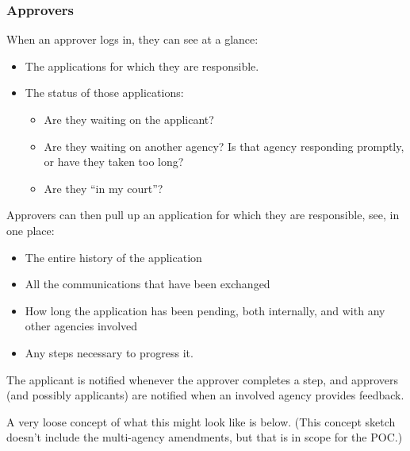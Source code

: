 \documentclass[12pt,a4paper,twosided]{article}
\begin{document}
\subsubsection{Approvers}

When an approver logs in, they can see at a glance:

\begin{itemize}
\itemsep1pt\parskip0pt
\item
  The applications for which they are responsible.
\item
  The status of those applications:

  \begin{itemize}
  \itemsep1pt\parskip0pt
  \item
    Are they waiting on the applicant?
  \item
    Are they waiting on another agency? Is that agency responding
    promptly, or have they taken too long?
  \item
    Are they ``in my court''?
  \end{itemize}
\end{itemize}

Approvers can then pull up an application for which they are
responsible, see, in one place:

\begin{itemize}
\itemsep1pt\parskip0pt
\item
  The entire history of the application
\item
  All the communications that have been exchanged
\item
  How long the application has been pending, both internally, and with
  any other agencies involved
\item
  Any steps necessary to progress it.
\end{itemize}

The applicant is notified whenever the approver completes a step, and
approvers (and possibly applicants) are notified when an involved agency
provides feedback.

A very loose concept of what this might look like is below. (This
concept sketch doesn't include the multi-agency amendments, but that is
in scope for the POC.)
\end{document}
